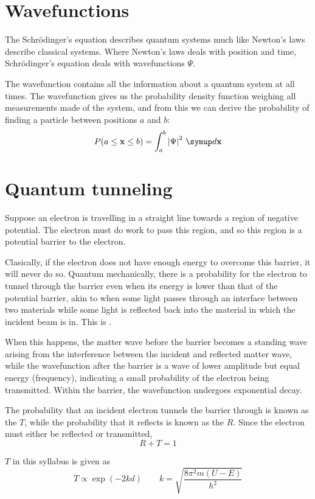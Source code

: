 \documentclass[Physics.tex]{subfiles}
\begin{document}
\section{Wavefunctions}
The Schr\"odinger's equation describes quantum systems much like Newton's laws describe classical systems. Where Newton's laws deals with position and time, Schr\"odinger's equation deals with wavefunctions \(\Psi\).

The wavefunction contains all the information about a quantum system at all times. The wavefunction gives us the probability density function weighing all measurements made of the system, and from this we can derive the probability of finding a particle between positions \(a\) and \(b\): \begin{equation}P(a \leq \mathbf{x} \leq b) = \int_a^b\left|\Psi\right|^2\slid\mathbf{x}\end{equation}
\section{Quantum tunneling}
Suppose an electron is travelling in a straight line towards a region of negative potential. The electron must do work to pass this region, and so this region is a potential barrier to the electron.

Clasically, if the electron does not have enough energy to overcome this barrier, it will never do so. Quantum mechanically, there is a probability for the electron to tunnel through the barrier even when its energy is lower than that of the potential barrier, akin to when some light passes through an interface between two materials while some light is reflected back into the material in which the incident beam is in. This is .

When this happens, the matter wave before the barrier becomes a standing wave arising from the interference between the incident and reflected matter wave, while the wavefunction after the barrier is a wave of lower amplitude but equal energy (frequency), indicating a small probability of the electron being transmitted. Within the barrier, the wavefunction undergoes exponential decay.

The probability that an incident electron tunnels the barrier through is known as the  \(T\), while the probability that it reflects is known as the  \(R\). Since the electron must either be reflected or transmitted, \[R+T=1\]

\(T\) in this syllabus is given as \begin{equation}T \propto \exp(-2kd)\qquad k = \sqrt{\frac{8\pi^2m(U-E)}{h^2}}\end{equation}
\end{document}
